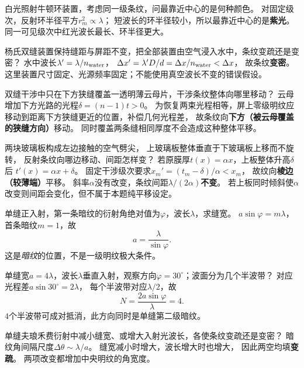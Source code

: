 \problemtext 白光照射牛顿环装置，考虑同一级条纹，问最靠近中心的是何种颜色。
\workings
对固定级次，反射环半径平方$ r_m^2\propto\lambda$；
短波长的环半径较小，所以最靠近中心的是\textbf{紫光}。
\crosscheck 同一可见级次中红光波长最长、环半径更大。

\problemtext 杨氏双缝装置保持缝距与屏距不变，把全部装置由空气浸入水中，条纹变疏还是变密？
\workings
水中波长$\lambda'=\lambda/n_{\rm water}$，
$\Delta x'=\lambda'D/d=\Delta x/n_{\rm water}<\Delta x$，
故条纹\textbf{变密}。
\crosscheck 这里装置尺寸固定、光源频率固定；不能使用真空波长不变的错误假设。

\problemtext 双缝干涉中只在下方狭缝覆盖一透明薄云母片，干涉条纹整体向哪里移动？
\workings
云母增加下方光路的光程$\delta=(n-1)t>0$。
为恢复两束光程相等，屏上零级明纹应移动到距离下方狭缝更近的位置，补偿几何光程差，
故条纹向\textbf{下方（被云母覆盖的狭缝方向）}移动。
\crosscheck 同时覆盖两条缝相同厚度不会造成这种整体平移。

\problemtext 两块玻璃板构成左边接触的空气劈尖，
上玻璃板整体垂直于下玻璃板上移而不旋转，
反射条纹向哪边移动、间距怎样变？
\workings
若原膜厚$t(x)=\alpha x$，上板整体升高$\delta$后
$t'(x)=\alpha x+\delta$。
固定干涉级次要求$x_m'=(t_m-\delta)/\alpha<x_m$，
故纹向\textbf{棱边（较薄端）}平移。
斜率$\alpha$没有改变，条纹间距$\lambda/(2\alpha)$\textbf{不变}。
\crosscheck 若上板同时倾斜使$\alpha$改变则间距会变化，但不属于本题纯平移设定。

\problemtext 单缝正入射，第一条暗纹的衍射角绝对值为$\varphi$，波长$\lambda$，求缝宽。
\workings
$a\sin\varphi=m\lambda$，首条暗纹$m=1$，故
\[
\boxed{a=\frac{\lambda}{\sin\varphi}}.
\]
\crosscheck 这是\emph{暗纹}的位置，不是一级明纹极大条件。

\problemtext 单缝宽$a=4\lambda$，波长$\lambda$垂直入射，观察方向$\varphi=30^\circ$；波面分为几个半波带？
\workings
对应光程差$a\sin30^\circ=2\lambda$，
每个半波带对应$\lambda/2$，故
\[
\boxed{N=\frac{2a\sin\varphi}{\lambda}=4}.
\]
\crosscheck $4$个半波带可成对抵消，此方向同时是单缝第二级暗纹。

\problemtext 单缝夫琅禾费衍射中减小缝宽、或增大入射光波长，各使条纹变疏还是变密？
\workings
暗纹角间隔尺度$\Delta\theta\sim\lambda/a$。
缝宽减小时增大，波长增大时也增大，
因此两空均填\textbf{变疏}。
\crosscheck 两项改变都增加中央明纹的角宽度。

